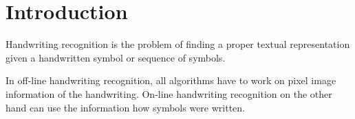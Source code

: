 \chapter{Introduction}\label{ch:Introduction}

Handwriting recognition is the problem of finding a proper textual representation
given a handwritten symbol or sequence of symbols.

In off-line handwriting recognition, all algorithms have to work on pixel image
information of the handwriting. On-line handwriting recognition on the other
hand can use the information how symbols were written.
